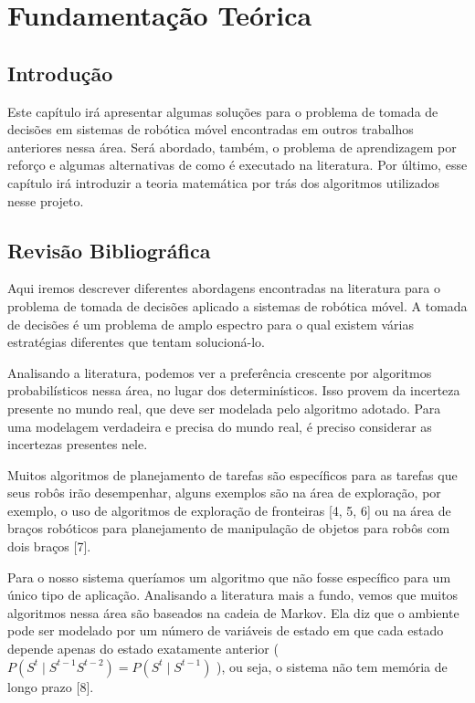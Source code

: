 
\chapter{Fundamentação Teórica\label{chap:FundamentacaoMatematica}}



\section{Introdução}

Este capítulo irá apresentar algumas soluções para o problema de tomada de decisões em sistemas de robótica móvel encontradas em outros trabalhos anteriores nessa área. Será abordado, também, o problema de aprendizagem por reforço e algumas alternativas de como é executado na literatura. Por último, esse capítulo irá introduzir a teoria matemática por trás dos algoritmos utilizados nesse projeto.


\section{Revisão Bibliográfica} \label{section:RevisaoBibliografica}

Aqui iremos descrever diferentes abordagens encontradas na literatura para o problema de tomada de decisões aplicado a sistemas de robótica móvel. A tomada de decisões é um problema de amplo espectro para o qual existem várias estratégias diferentes que tentam solucioná-lo.

Analisando a literatura, podemos ver a preferência crescente por algoritmos probabilísticos nessa área, no lugar dos determinísticos. Isso provem da incerteza presente no mundo real, que deve ser modelada pelo algoritmo adotado. Para uma modelagem verdadeira e precisa do mundo real, é preciso considerar as incertezas presentes nele.

Muitos algoritmos de planejamento de tarefas são específicos para as tarefas que seus robôs irão desempenhar, alguns exemplos são na área de exploração, por exemplo, o uso de algoritmos de exploração de fronteiras [4, 5, 6] ou na área de braços robóticos para planejamento de manipulação de objetos para robôs com dois braços [7].

Para o nosso sistema queríamos um algoritmo que não fosse específico para um único tipo de aplicação. Analisando a literatura mais a fundo, vemos que muitos algoritmos nessa área são baseados na cadeia de Markov. Ela diz que o ambiente pode ser modelado por um número de variáveis de estado em que cada estado depende apenas do estado exatamente anterior ( $ P(S^t\mid S^{t-1}S^{t-2})=P(S^t\mid S^{t-1}) $ ), ou seja, o sistema não tem memória de longo prazo [8].

